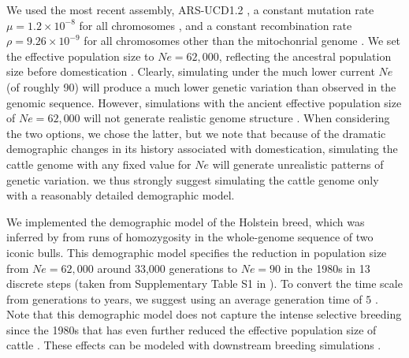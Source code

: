 \documentclass[hidelinks]{article}
\begin{document}
We used the most recent assembly, ARS-UCD1.2
\citep{Rosen2020}, a constant mutation rate \(\mu=1.2\times 10^{-8}\) for all chromosomes \citep{Harland2017}, and a constant recombination rate \(\rho=9.26 \times 10^{-9}\) for all chromosomes other than the mitochonrial genome \citep{Ma2015}.
%
We set the effective population size to $Ne=62,000$, reflecting the ancestral population size before  domestication  \citep{MacLeod2013}.
%
%
Clearly, simulating under the much lower current $Ne$ (of roughly 90) will produce a much lower genetic variation than observed in the genomic sequence.
%
However, simulations with the ancient effective population size of $Ne=62,000$ will not generate realistic genome structure  \citep[e.g.,][]{Rosen2020}.
%
When considering the two options, we chose the latter, but we note that because of the dramatic demographic changes in its history associated with domestication, simulating the cattle genome with any fixed value for $Ne$ will generate unrealistic patterns of genetic variation.
%
we thus strongly suggest simulating the cattle genome only with a reasonably detailed demographic model.

We implemented the demographic model of the Holstein breed, which was
inferred by \cite{MacLeod2013} from runs of homozygosity in the whole-genome sequence of two iconic bulls. 
%
This demographic model specifies the reduction in population size from $Ne=62,000$  around 33,000 generations to $Ne=90$ in the 1980s in 13 discrete steps (taken from Supplementary Table S1 in \cite{MacLeod2013}). 
%
To convert the time scale from generations to years, we suggest using an average generation time of $5$ \citep{MacLeod2013}.
%
Note that this demographic model does not capture the intense selective breeding since the 1980s that has even further reduced the effective population size of cattle \citep{MacLeod2014, Gaynor2020, Obsteter2021}. These effects can be modeled with
downstream breeding simulations \citep[e.g.,][]{Gaynor2020}.
%
\end{document}
